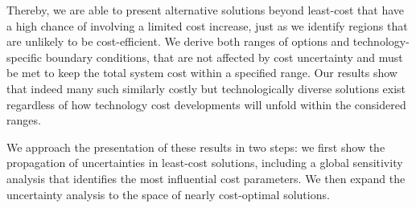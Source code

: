 
Thereby, we are able to present alternative solutions beyond least-cost that
have a high chance of involving a limited cost increase, just as we identify
regions that are unlikely to be cost-efficient. We derive both ranges of options
and technology-specific boundary conditions, that are not affected by cost
uncertainty and must be met to keep the total system cost within a specified
range. Our results show that indeed many such similarly costly but
technologically diverse solutions exist regardless of how technology cost
developments will unfold within the considered ranges.


We approach the presentation of these results in two steps: we first show the
propagation of uncertainties in least-cost solutions, including a global
sensitivity analysis that identifies the most influential cost parameters. We
then expand the uncertainty analysis to the space of nearly cost-optimal
solutions.








